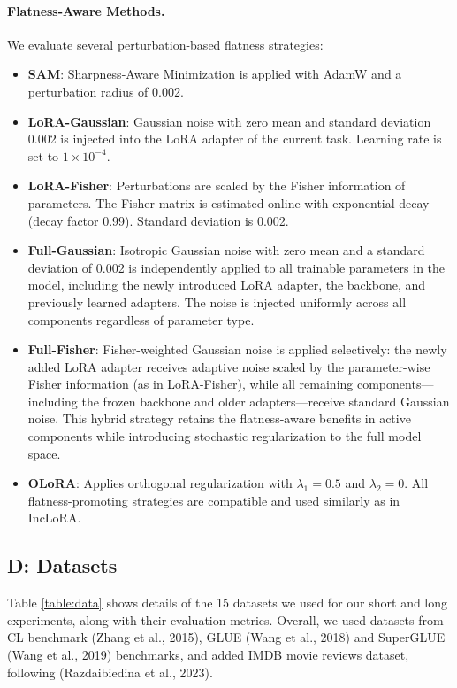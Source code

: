 \documentclass[letterpaper]{article} %
\begin{document}
\paragraph{Flatness-Aware Methods.}  
We evaluate several perturbation-based flatness strategies:

\begin{itemize}
    \item \textbf{SAM}: Sharpness-Aware Minimization is applied with AdamW and a perturbation radius of 0.002.
    \item \textbf{LoRA-Gaussian}: Gaussian noise with zero mean and standard deviation 0.002 is injected into the LoRA adapter of the current task. Learning rate is set to $1\times10^{-4}$.
    \item \textbf{LoRA-Fisher}: Perturbations are scaled by the Fisher information of parameters. The Fisher matrix is estimated online with exponential decay (decay factor 0.99). Standard deviation is 0.002.
    \item \textbf{Full-Gaussian}: Isotropic Gaussian noise with zero mean and a standard deviation of 0.002 is independently applied to all trainable parameters in the model, including the newly introduced LoRA adapter, the backbone, and previously learned adapters. The noise is injected uniformly across all components regardless of parameter type.

    \item \textbf{Full-Fisher}: Fisher-weighted Gaussian noise is applied selectively: the newly added LoRA adapter receives adaptive noise scaled by the parameter-wise Fisher information (as in LoRA-Fisher), while all remaining components—including the frozen backbone and older adapters—receive standard Gaussian noise. This hybrid strategy retains the flatness-aware benefits in active components while introducing stochastic regularization to the full model space.

    \item \textbf{OLoRA}: Applies orthogonal regularization with $\lambda_1 = 0.5$ and $\lambda_2 = 0$. All flatness-promoting strategies are compatible and used similarly as in IncLoRA.
\end{itemize}






\subsection{D: Datasets}
Table \ref{table:data} shows details of the 15 datasets we used for our short and long experiments, along with their evaluation metrics. Overall, we used datasets from CL benchmark (Zhang et al., 2015), GLUE (Wang et al., 2018) and SuperGLUE (Wang et al., 2019) benchmarks, and added IMDB movie reviews dataset, following (Razdaibiedina et al., 2023).
\end{document}
